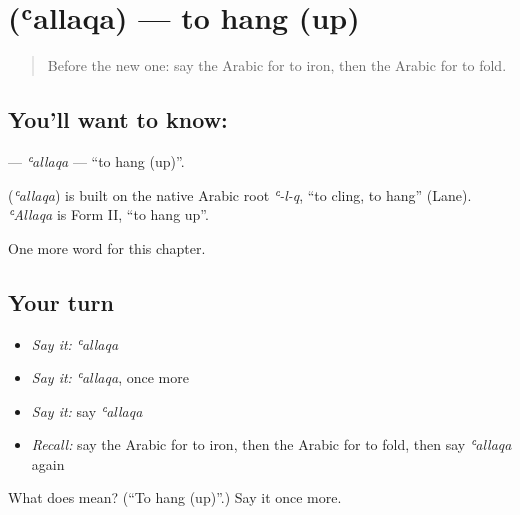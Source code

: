 \section[\texorpdfstring{\ar{علق} (ʿallaqa)}{علق (ʿallaqa)}]{ (ʿallaqa) — to hang (up)}

\label{lesson:AR-C223-allaqa}



\begin{quote}
Before the new one: say the Arabic for to iron, then the Arabic for to fold.
\end{quote}

\subsection*{You'll want to know: }
\textbf{} — \emph{ʿallaqa} — \textquotedblleft{}to hang (up)\textquotedblright{}.

\begin{cousinweb}
\textbf{} (\emph{ʿallaqa}) is built on the native Arabic root \emph{ʿ-l-q}, \textquotedblleft{}to cling, to hang\textquotedblright{} (Lane). \emph{ʿAllaqa} is Form II, \textquotedblleft{}to hang up\textquotedblright{}.
\end{cousinweb}

\begin{grammarlens}[title={What you've built}]
One more word for this chapter.
\end{grammarlens}

\subsection*{Your turn}
\begin{itemize}
\raggedright
  \item \emph{Say it:} \emph{ʿallaqa}
  \item \emph{Say it:} \emph{ʿallaqa}, once more
  \item \emph{Say it:} say \emph{ʿallaqa}
  \item \emph{Recall:} say the Arabic for to iron, then the Arabic for to fold, then say \emph{ʿallaqa} again
\end{itemize}

\begin{tcolorbox}[breakable,colback=teal!4,colframe=teal!35!black,title={Before you move on}]
What does  mean? (\textquotedblleft{}To hang (up)\textquotedblright{}.) Say it once more.
\end{tcolorbox}

